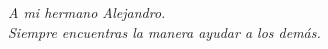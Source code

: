 \chapter*{}
\vspace*{\fill}
\ \hfill \textit{A mi hermano Alejandro.}\\
\vspace*{\fill}
\vspace*{\fill}
\ \hfill \textit{Siempre encuentras la manera ayudar a los dem\'as.}
\vspace*{\fill}